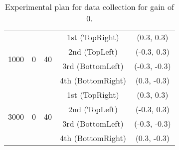 \begin{table}[ht]
{\begin{tabular}{ccccc}
                \midrule

                \multirow{4}{*}{1000} & \multirow{4}{*}{0} & \multirow{4}{*}{40} & 1st (\textsf{TopRight}) & (0.3, 0.3) \\
                & & & 2nd (\textsf{TopLeft}) & (-0.3, 0.3) \\
                & & & 3rd (\textsf{BottomLeft}) & (-0.3, -0.3) \\
                & & & 4th (\textsf{BottomRight}) & (0.3, -0.3) \\

                \midrule

                \multirow{4}{*}{3000} & \multirow{4}{*}{0} & \multirow{4}{*}{40} & 1st (\textsf{TopRight}) & (0.3, 0.3) \\
                & & & 2nd (\textsf{TopLeft}) & (-0.3, 0.3) \\
                & & & 3rd (\textsf{BottomLeft}) & (-0.3, -0.3) \\
                & & & 4th (\textsf{BottomRight}) & (0.3, -0.3) \\
                \bottomrule
            \end{tabular}
            }
            \caption{Experimental plan for data collection for gain of 0.}
            \label{table:exp_plan_exposure_time}
        \end{table}

